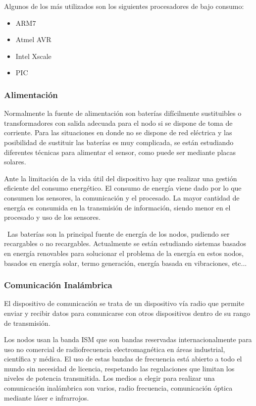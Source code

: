 Algunos de los m\'as utilizados son los siguientes procesadores de bajo consumo:

\begin{itemize}
\item ARM7
\item Atmel AVR
\item Intel Xscale
\item PIC
\end{itemize}


\subsubsection{Alimentaci\'on}
Normalmente la fuente de alimentaci\'on son bater\'ias dif\'icilmente sustituibles o transformadores con salida adecuada para
el nodo si se dispone de toma de corriente. Para las situaciones en donde no se dispone de red el\'ectrica y las
posibilidad de sustituir las bater\'ias es muy complicada, se est\'an estudiando diferentes t\'ecnicas para alimentar el
sensor, como puede ser mediante placas solares. 

Ante la limitaci\'on de la vida \'util del dispositivo hay que realizar una gesti\'on eficiente del consumo energ\'etico. El
consumo de energ\'ia viene dado por lo que consumen los sensores, la comunicaci\'on y el procesado. La mayor cantidad de
energ\'ia es consumida en la transmisi\'on de informaci\'on, siendo menor en el procesado y uso de los sensores.

\ Las bater\'ias son la principal fuente de energ\'ia de los nodos, pudiendo ser recargables o no recargables. Actualmente
se est\'an estudiando sistemas basados en energ\'ia renovables para solucionar el problema de la energ\'ia en estos nodos,
basados en energ\'ia solar, termo generaci\'on, energ\'ia basada en vibraciones, etc...

\subsubsection{Comunicaci\'on Inal\'ambrica }
El dispositivo de comunicaci\'on se trata de un dispositivo v\'ia radio que permite enviar y recibir datos para comunicarse
con otros dispositivos dentro de su rango de transmisi\'on. 

Los nodos usan la banda ISM que son bandas reservadas internacionalmente para uso no comercial de radiofrecuencia
electromagn\'etica en \'areas industrial, cient\'ifica y m\'edica. El uso de estas bandas de frecuencia est\'a abierto a todo el
mundo sin necesidad de licencia, respetando las regulaciones que limitan los niveles de potencia transmitida. Los
medios a elegir para realizar una comunicaci\'on inal\'ambrica son varios, radio frecuencia, comunicaci\'on \'optica mediante
l\'aser e infrarrojos. 

